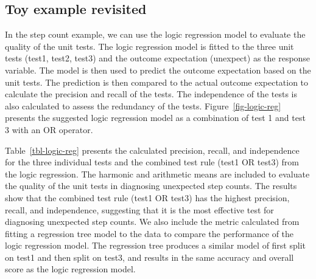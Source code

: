 \documentclass[
]{jds}
\begin{document}
\subsection{Toy example revisited}\label{toy-example-revisited}

In the step count example, we can use the logic regression model to
evaluate the quality of the unit tests. The logic regression model is
fitted to the three unit tests (test1, test2, test3) and the outcome
expectation (unexpect) as the response variable. The model is then used
to predict the outcome expectation based on the unit tests. The
prediction is then compared to the actual outcome expectation to
calculate the precision and recall of the tests. The independence of the
tests is also calculated to assess the redundancy of the tests.
Figure~\ref{fig-logic-reg} presents the suggested logic regression model
as a combination of test 1 and test 3 with an OR operator.

Table~\ref{tbl-logic-reg} presents the calculated precision, recall, and
independence for the three individual tests and the combined test rule
(test1 OR test3) from the logic regression. The harmonic and arithmetic
means are included to evaluate the quality of the unit tests in
diagnosing unexpected step counts. The results show that the combined
test rule (test1 OR test3) has the highest precision, recall, and
independence, suggesting that it is the most effective test for
diagnosing unexpected step counts. We also include the metric calculated
from fitting a regression tree model to the data to compare the
performance of the logic regression model. The regression tree produces
a similar model of first split on test1 and then split on test3, and
results in the same accuracy and overall score as the logic regression
model.
\end{document}
